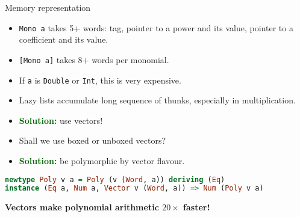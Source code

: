 \documentclass[handout]{beamer}
\begin{document}
\begin{frame}[fragile]{Memory representation}

\begin{itemize}[<+->]
\item {\tt Mono a} takes 5+ words: tag, pointer to a power and
      its value, pointer to a coefficient and its value.
\item {\tt [Mono a]} takes 8+ words per monomial.
\item If {\tt a} is {\tt Double} or {\tt Int},
      this is very expensive.
\item Lazy lists accumulate long sequence of thunks,
      especially in multiplication.
\item \textcolor{darkgreen}{\bf Solution:}
      use vectors!
\item Shall we use boxed or unboxed vectors?
\item \textcolor{darkgreen}{\bf Solution:}
      be polymorphic by vector flavour.
\end{itemize}

\pause

\begin{lstlisting}[language=Haskell]
newtype Poly v a = Poly (v (Word, a)) deriving (Eq)
instance (Eq a, Num a, Vector v (Word, a)) => Num (Poly v a)
\end{lstlisting}

\medskip

\centerline{\bf Vectors make polynomial arithmetic $20\times$ faster!}

\end{frame}
\end{document}
